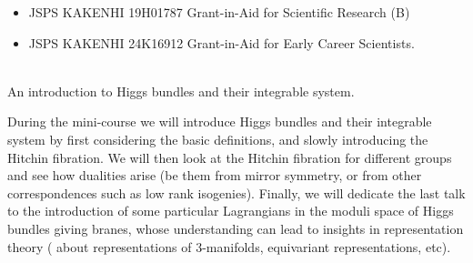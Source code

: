 \documentclass[dvipdfmx,a4paper,12pt]{article}
\theoremstyle{plain} %
\theoremstyle{definition} %
\begin{document}


  \vspace{-11pt}
\begin{itemize}
  \setlength{\parskip}{0cm} 
  \setlength{\itemsep}{0cm}
\item JSPS KAKENHI 19H01787 Grant-in-Aid for Scientific Research (B)
\item JSPS KAKENHI 24K16912 Grant-in-Aid for Early Career Scientists.  
\end{itemize}









\newpage

\vskip5mm


\\
An introduction to Higgs bundles and their integrable system.

\vskip1mm
During the mini-course we will introduce Higgs bundles and
their integrable system by first considering the basic definitions,
and slowly introducing the Hitchin fibration. We will then look at the
Hitchin fibration for different groups and see how dualities arise (be
them from mirror symmetry, or from other correspondences such as low
rank isogenies). Finally, we will dedicate the last talk to the
introduction of some particular Lagrangians in the moduli space of
Higgs bundles giving branes, whose understanding can lead to insights
in representation theory ( about representations of 3-manifolds,
equivariant representations, etc).
\vskip5mm
\end{document}
